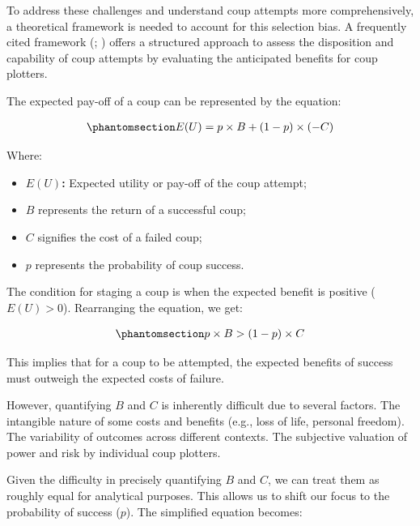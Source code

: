 \documentclass[
  12pt,
]{report}
\providecommand{\tightlist}{%
  \setlength{\itemsep}{0pt}\setlength{\parskip}{0pt}}\usepackage{longtable,booktabs,array}
\begin{document}
To address these challenges and understand coup attempts more
comprehensively, a theoretical framework is needed to account for this
selection bias. A frequently cited framework
(;
) offers a structured
approach to assess the disposition and capability of coup attempts by
evaluating the anticipated benefits for coup plotters.

The expected pay-off of a coup can be represented by the equation:

\begin{equation}\phantomsection\label{eq-eq1}{
\begin{aligned}
E(U) = p \times B + (1 - p) \times (-C)
\end{aligned}
}\end{equation}

Where:

\begin{itemize}
\tightlist
\item
  \(E(U)\)\textbf{:} Expected utility or pay-off of the coup attempt;
\item
  \(B\) represents the return of a successful coup;
\item
  \(C\) signifies the cost of a failed coup;
\item
  \(p\) represents the probability of coup success.
\end{itemize}

The condition for staging a coup is when the expected benefit is
positive (\(E(U) > 0\)). Rearranging the equation, we get:

\begin{equation}\phantomsection\label{eq-eq2}{
\begin{aligned}
p \times B > (1 - p) \times C
\end{aligned}
}\end{equation}

This implies that for a coup to be attempted, the expected benefits of
success must outweigh the expected costs of failure.

However, quantifying \(B\) and \(C\) is inherently difficult due to
several factors. The intangible nature of some costs and benefits (e.g.,
loss of life, personal freedom). The variability of outcomes across
different contexts. The subjective valuation of power and risk by
individual coup plotters.

Given the difficulty in precisely quantifying \(B\) and \(C\), we can
treat them as roughly equal for analytical purposes. This allows us to
shift our focus to the probability of success (\(p\)). The simplified
equation becomes:
\end{document}
